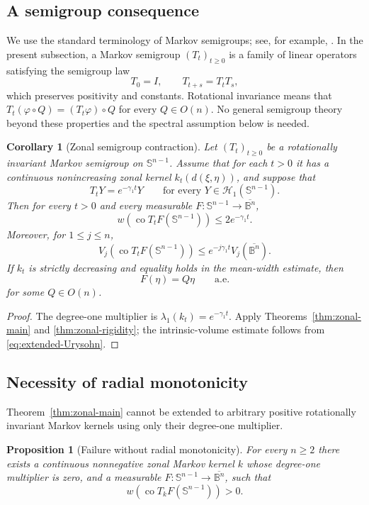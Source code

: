 \documentclass[11pt,reqno]{amsart}
\newtheorem{corollary}[theorem]{Corollary}
\newtheorem{proposition}[theorem]{Proposition}
\theoremstyle{remark}
\begin{document}
\subsection{A semigroup consequence}

We use the standard terminology of Markov semigroups; see, for example,
\cite[Chapter~1]{BakryGentilLedoux}.  In the present subsection, a Markov
semigroup $(T_t)_{t\ge0}$ is a family of linear operators satisfying the
semigroup law
\[
 T_0=I,\qquad T_{t+s}=T_tT_s,
\]
which preserves positivity and constants.  Rotational invariance means that
$T_t(\varphi\circ Q)=(T_t\varphi)\circ Q$ for every $Q\in O(n)$.  No general
semigroup theory beyond these properties and the spectral assumption below
is needed.

\begin{corollary}[Zonal semigroup contraction]\label{cor:zonal-semigroup}
Let $(T_t)_{t\ge0}$ be a rotationally invariant Markov semigroup on
$\mathbb S^{n-1}$.  Assume that for each $t>0$ it has a continuous
nonincreasing zonal kernel $k_t(d(\xi,\eta))$, and suppose that
\[
 T_tY=e^{-\gamma_1t}Y
 \qquad
 \text{for every }Y\in\mathcal H_1(\mathbb S^{n-1}).
\]
Then for every $t>0$ and every measurable
$F:\mathbb S^{n-1}\to\overline{\mathbb B^n}$,
\[
 w\!\left(
 \operatorname{co}T_tF(\mathbb S^{n-1})
 \right)
 \le
 2e^{-\gamma_1t}.
\]
Moreover, for $1\le j\le n$,
\[
 V_j\!\left(
 \operatorname{co}T_tF(\mathbb S^{n-1})
 \right)
 \le
 e^{-j\gamma_1t}V_j(\overline{\mathbb B^n}).
\]
If $k_t$ is strictly decreasing and equality holds in the mean-width
estimate, then
\[
 F(\eta)=Q\eta
 \qquad\text{a.e.}
\]
for some $Q\in O(n)$.
\end{corollary}

\begin{proof}
The degree-one multiplier is
$\lambda_1(k_t)=e^{-\gamma_1t}$.  Apply
Theorems~\ref{thm:zonal-main} and \ref{thm:zonal-rigidity}; the
intrinsic-volume estimate follows from
\eqref{eq:extended-Urysohn}.
\end{proof}

\subsection{Necessity of radial monotonicity}

Theorem~\ref{thm:zonal-main} cannot be extended to arbitrary positive
rotationally invariant Markov kernels using only their degree-one
multiplier.

\begin{proposition}[Failure without radial monotonicity]
\label{prop:nonmonotone}
For every $n\ge2$ there exists a continuous nonnegative zonal Markov kernel
$k$ whose degree-one multiplier is zero, and a measurable
$F:\mathbb S^{n-1}\to\overline{\mathbb B^n}$, such that
\[
 w\!\left(
 \operatorname{co}T_kF(\mathbb S^{n-1})
 \right)>0.
\]
\end{proposition}
\end{document}
